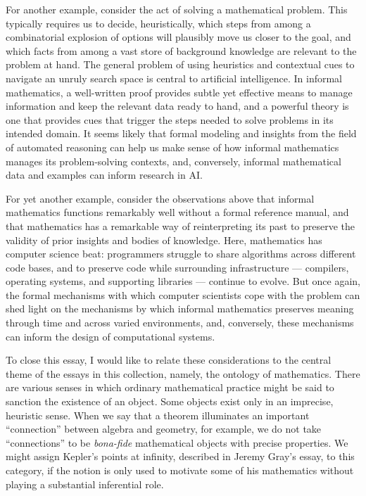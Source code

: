 \documentclass[12pt]{article}
\begin{document}
For another example, consider the act of solving a mathematical problem. This typically requires us to decide, heuristically, which steps from among a combinatorial explosion of options will plausibly move us closer to the goal, and which facts from among a vast store of background knowledge are relevant to the problem at hand. The general problem of using heuristics and contextual cues to navigate an unruly search space is central to artificial intelligence. In informal mathematics, a well-written proof provides subtle yet effective means to manage information and keep the relevant data ready to hand, and a powerful theory is one that provides cues that trigger the steps needed to solve problems in its intended domain. It seems likely that formal modeling and insights from the field of automated reasoning can help us make sense of how informal mathematics manages its problem-solving contexts, and, conversely, informal mathematical data and examples can inform research in AI.

For yet another example, consider the observations above that informal mathematics functions remarkably well without a formal reference manual, and that mathematics has a remarkable way of reinterpreting its past to preserve the validity of prior insights and bodies of knowledge. Here, mathematics has computer science beat: programmers struggle to share algorithms across different code bases, and to preserve code while surrounding infrastructure --- compilers, operating systems, and supporting libraries --- continue to evolve. But once again, the formal mechanisms with which computer scientists cope with the problem can shed light on the mechanisms by which informal mathematics preserves meaning through time and across varied environments, and, conversely, these mechanisms can inform the design of computational systems.

To close this essay, I would like to relate these considerations to the central theme of the essays in this collection, namely, the ontology of mathematics. There are various senses in which ordinary mathematical practice might be said to sanction the existence of an object. Some objects exist only in an imprecise, heuristic sense. When we say that a theorem illuminates an important ``connection'' between algebra and geometry, for example, we do not take ``connections'' to be \emph{bona-fide} mathematical objects with precise properties. We might assign Kepler's points at infinity, described in Jeremy Gray's essay, to this category, if the notion is only used to motivate some of his mathematics without playing a substantial inferential role. 
\end{document}
